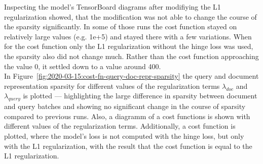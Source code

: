 Inspecting the model's TensorBoard diagrams after modifiying the L1 regularization showed,
    that the modification was not able to change the course of the sparsity significantly.
In some of those runs the cost function stayed on relatively large values (e.g. 1e+5)
    and stayed there with a few variations.
When for the cost function only the L1 regularization without the hinge loss was used,
    the sparsity also did not change much.
Rather than the cost function approaching the value 0, it settled down to a value
    around 400.\\
In Figure~\ref{fig:2020-03-15:cost-fn-query-doc-repr-sparsity} 
    the query and document representation sparsity for different values of the 
    regularization terms $\lambda_{doc}$ and $\lambda_{query}$ is plotted --- 
    highlighting the large difference in sparsity between document and query batches
    and showing no significant change in the course of sparsity compared to
    previous runs.
Also, a diagramm of a cost functions is shown with different values of the 
    regularization terms.
Additionally, a cost function is plotted, where the model's loss is not computed
    with the hinge loss, but only with the L1 regularization,
    with the result that the cost function is equal to the L1 regularization.

